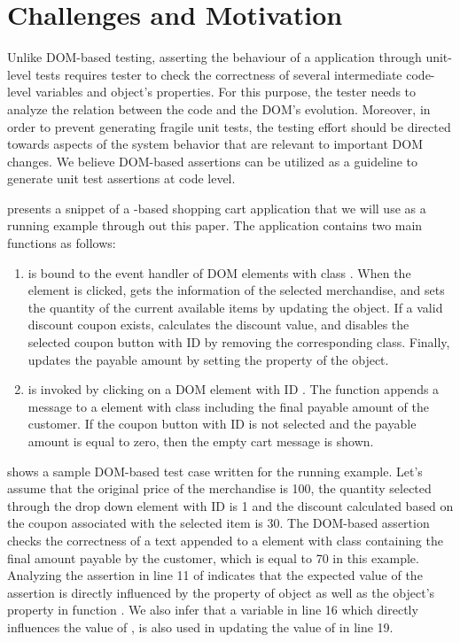 \section{Challenges and Motivation} \label{Sec:motivation}
Unlike DOM-based testing, asserting the behaviour of a \javascript application through unit-level tests requires tester to check the correctness of several intermediate code-level variables and object's properties. For this purpose, the tester needs to analyze the relation between the \javascript code and the DOM's evolution. Moreover, in order to prevent generating fragile unit tests, the testing effort should be directed towards aspects of the system behavior that are relevant to important DOM changes. We believe DOM-based assertions can be utilized as a guideline to generate unit test assertions at \javascript code level. 

 presents a snippet of a \javascript-based shopping cart application that we will use as a running example through out this paper. The application contains two main functions as follows:
\begin{enumerate}
\item {} is bound to the event handler of DOM elements with class . When the element is clicked,  gets the information of the selected merchandise, and sets the quantity of the current available items by updating the  object. If a valid discount coupon exists,  calculates the discount value, and disables the selected  coupon button with ID  by removing the corresponding class. Finally,  updates the payable amount by setting the  property of the  object.
\item {} is invoked by clicking on a DOM element with ID . The function appends a message to a  element with class  including the final payable amount of the customer. If the  coupon button with ID  is not selected and the payable amount is equal to zero, then the empty cart message is shown.    
\end{enumerate}
 shows a sample DOM-based \selenium test case written for the running example. Let's assume that the original price of the merchandise is 100, the quantity selected through the drop down element with ID  is 1 and the discount calculated based on the coupon associated with the selected item is 30. 
The DOM-based assertion checks the correctness of a text appended to a  element with class  containing the final amount payable by the customer, which is equal to 70 in this example.
Analyzing the assertion in line 11 of  indicates that the expected value of the assertion is directly influenced by the  property of  object as well as the object's property  in function . We also infer that a variable in line 16 which directly influences the value of , is also used in updating the value of  in line 19.

